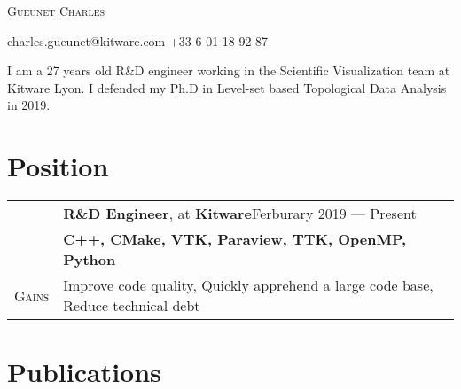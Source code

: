 \documentclass[a4paper, oneside, final]{scrartcl}
\newcommand{\rowBG}{\rowcolor{customRowBG!15}}
\begin{document}
\begin{center}

{\fontsize{36}{36}\selectfont\scshape Gueunet Charles} %

{\Large\Letter} charles.gueunet@kitware.com \hspace{0.2cm} {\Large\Telefon} +33 6 01 18 92 87


\vspace{0.4cm}

\begin{flushleft}
  I am a 27 years old R\&D engineer working in the Scientific Visualization
  team at Kitware Lyon. I defended my Ph.D in Level-set based Topological Data
  Analysis in 2019.
\end{flushleft}

\vspace{0.3cm}



\section{Position}

\begin{tabularx}{1\linewidth}{>{\raggedleft\scshape}p{2.1cm}X}
  \rowBG{Position}  & \textbf{R\&D Engineer}, at \textbf{Kitware}\hfill{Ferburary 2019 --- Present}\\
  \rowBG{Languages} & \textbf{C++, CMake, VTK, Paraview, TTK, OpenMP, Python}\\
  Gains             & Improve code quality, Quickly apprehend a large code base, Reduce technical debt
\end{tabularx}

\section{Publications}


\end{center}
\end{document}
